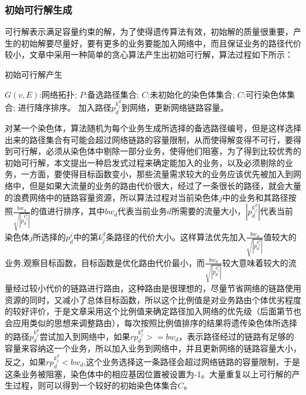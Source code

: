 \subsubsection{初始可行解生成}
可行解表示满足容量约束的解，为了使得遗传算法有效，初始解的质量很重要，产生的初始解要尽量好，要有更多的业务要能加入网络中，而且保证业务的路径代价较小，文章中采用一种简单的贪心算法产生出初始可行解，算法过程如下所示：
\begin{algorithm}[htb] 
\caption{初始可行解产生} 
\label{alg:Framwork} 
\begin{algorithmic}[1] 
\Require 
$G(v,E)$:网络拓扑;
$P$:备选路径集合;
$C$:未初始化的染色体集合;  
\Ensure 
$C$:可行染色体集合; 
\EndFor
\EndFor
{}
\EndFor
{}进行降序排序。
\State 加入路径$p^{k^d_j}_d$到网络，更新网络链路容量。
\Else
{}
\EndIf
\EndFor
\EndFor
\end{algorithmic} 
\end{algorithm}
  对某一个染色体，算法随机为每个业务生成所选择的备选路径编号，但是这样选择出来的路径集合有可能会超过网络链路的容量限制，从而使得解变得不可行，要得到可行解，必须从染色体中剔除一部分业务，使得他们阻塞，为了得到比较优秀的初始可行解，本文提出一种启发式过程来确定能加入的业务，以及必须剔除的业务，一方面，要使得目标函数变小，那些流量需求较大的业务应该优先被加入到网络中，但是如果大流量的业务的路由代价很大，经过了一条很长的路径，就会大量的浪费网络中的链路容量资源，所以算法过程对当前染色体$j$中的业务和其路径按照$\frac{bw_d}{\sqrt{|p^{k^d_j}_d|}}$的值进行排序，其中${bw_d}$代表当前业务$d$所需要的流量大小，$|p^{k^d_j}_d|$代表当前染色体$j$所选择的$p^j_d$中的第${k^d_j}$条路径的代价大小。这样算法优先加入$\frac{bw_d}{\sqrt{|p^{k^d_j}_d|}}$值较大的业务,观察目标函数，目标函数是优化路由代价最小，而$\frac{bw_d}{\sqrt{|p^{k^d_j}_d|}}$较大意味着较大的流量经过较小代价的链路进行路由，这种路由是很理想的，尽量节省网络的链路使用资源的同时，又减小了总体目标函数，所以这个比例值是对业务路由个体优劣程度的较好评价，于是文章采用这个比例值来确定路径加入网络的优先级（后面第节也会应用类似的思想来调整路由），每次按照比例值排序的结果将遗传染色体所选择的路径$p^{k^d_j}_d$尝试加入到网络中，如果$rp^{k^d_j}_d>=bw_d$，表示路径经过的链路有足够的容量来容纳这一个业务，所以加入业务到网络中，并且更新网络的链路容量大小，反之，如果$rp^{k^d_j}_d<bw_d$,这个业务选择这一条路径会超过网络链路的容量限制，于是这条业务被阻塞，染色体中的相应基因位置被设置为-1。大量重复以上可行解的产生过程，则可以得到一个较好的初始染色体集合$C$。
